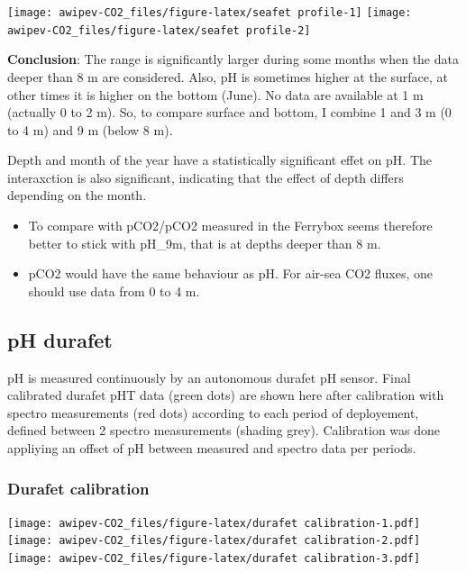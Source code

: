 \documentclass[
]{article}
\providecommand{\tightlist}{%
  \setlength{\itemsep}{0pt}\setlength{\parskip}{0pt}}
\begin{document}
\begin{center}\texttt{[image: awipev-CO2\_files/figure-latex/seafet profile-1]} \texttt{[image: awipev-CO2\_files/figure-latex/seafet profile-2]} \end{center}

\textbf{Conclusion}: The range is significantly larger during some
months when the data deeper than 8 m are considered. Also, pH is
sometimes higher at the surface, at other times it is higher on the
bottom (June). No data are available at 1 m (actually 0 to 2 m). So, to
compare surface and bottom, I combine 1 and 3 m (0 to 4 m) and 9 m
(below 8 m).

Depth and month of the year have a statistically significant effet on
pH. The interaxction is also significant, indicating that the effect of
depth differs depending on the month.

\begin{itemize}
\tightlist
\item
  To compare with pCO2/pCO2 measured in the Ferrybox seems therefore
  better to stick with pH\_9m, that is at depths deeper than 8 m.
\item
  pCO2 would have the same behaviour as pH. For air-sea CO2 fluxes, one
  should use data from 0 to 4 m.
\end{itemize}

\hypertarget{ph-durafet}{%
\subsection{pH durafet}\label{ph-durafet}}

pH is measured continuously by an autonomous durafet pH sensor. Final
calibrated durafet pHT data (green dots) are shown here after
calibration with spectro measurements (red dots) according to each
period of deployement, defined between 2 spectro measurements (shading
grey). Calibration was done appliying an offset of pH between measured
and spectro data per periods.

\hypertarget{durafet-calibration}{%
\subsubsection{\texorpdfstring{\textbf{Durafet
calibration}}{Durafet calibration}}\label{durafet-calibration}}

\texttt{[image: awipev-CO2\_files/figure-latex/durafet calibration-1.pdf]}
\texttt{[image: awipev-CO2\_files/figure-latex/durafet calibration-2.pdf]}
\texttt{[image: awipev-CO2\_files/figure-latex/durafet calibration-3.pdf]}
\end{document}
